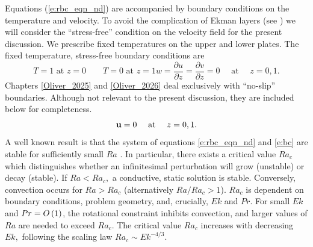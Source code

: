 Equations (\ref{e:rbc_eqn_nd}) are accompanied by boundary conditions on the temperature and velocity. 
To avoid the complication of Ekman layers (see \citep{hG68})  
we will consider the ``stress-free'' condition on the velocity field for the present discussion. We prescribe fixed temperatures on the upper and lower plates.
The fixed temperature, stress-free boundary conditions are 
\begin{subequations}
\begin{equation}
T =1\text{ at } z=0 \qquad T =0 \text{ at } z=1
	\label{e:bc_t}
\end{equation}
\begin{equation}
	w = \frac{\partial u}{\partial z} = \frac{\partial v}{\partial z}=0 \quad\text{ at }\quad z = 0,1.
	\label{e:bc_vsf}
\end{equation}
\label{e:bc}	
\end{subequations} 
Chapters \ref{Oliver_2025} and \ref{Oliver_2026} deal exclusively with ``no-slip'' boundaries. Although not relevant to the present discussion, they are included below for completeness.
\begin{equation}
	\mathbf{u}=0 \quad \text{ at }\quad z=0,1.	
	\label{e:noslip}
\end{equation}
A well known result is that the system of equations \eqref{e:rbc_eqn_nd} and \eqref{e:bc} are stable for sufficiently small $Ra$ \citep{sC61}.
In particular, there exists a critical value $Ra_{c}$ which distinguishes whether an infinitesimal perturbation will grow (unstable) or decay (stable). 
If $Ra<Ra_c,$ a conductive, static solution is stable. 
Conversely, convection occurs for $Ra>Ra_c$ (alternatively $Ra/Ra_c>1$). $Ra_c$ is dependent on boundary conditions, problem geometry, and, crucially, $Ek$ and $Pr.$ 
For small $Ek$ and $Pr = O\left ( 1\right ) $, the rotational constraint inhibits convection, and larger values of $Ra$ are needed to exceed $Ra_{c}$. 
The critical value $Ra_c$ increases with decreasing $Ek,$ following the scaling law $Ra_c\sim Ek^{-4/3}$.
